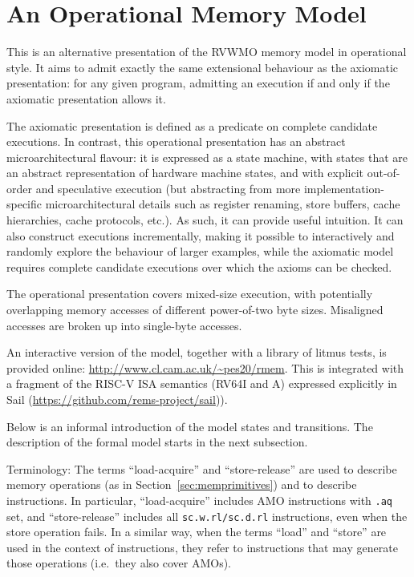 \section{An Operational Memory Model}
\label{sec:operational}
This is an alternative presentation of the RVWMO memory model in
operational style.
%
It aims to admit exactly the same extensional behaviour as the
axiomatic presentation: for any given program, admitting an execution
if and only if the axiomatic presentation allows it.

The axiomatic presentation is defined as a predicate on complete
candidate executions.  In contrast, this operational presentation has
an abstract microarchitectural flavour: it is expressed as a state
machine, with states that are an abstract representation of hardware
machine states, and with explicit out-of-order and speculative
execution
(but abstracting from more implementation-specific microarchitectural
details such as register renaming, store buffers, cache hierarchies, cache protocols, etc.).
As such, it can provide useful intuition.
It can also
construct executions incrementally, making it possible to
interactively and randomly explore the behaviour of larger examples,
while the axiomatic model requires complete candidate executions
over which the axioms can be checked.

The operational presentation covers mixed-size execution, with
potentially overlapping memory accesses of different power-of-two byte
sizes.  Misaligned accesses are broken up into single-byte accesses.

An interactive version of the model, together with a library of litmus tests,
is provided online: \url{http://www.cl.cam.ac.uk/~pes20/rmem}.
This is integrated with a fragment of the RISC-V ISA semantics
(RV64I and A) expressed explicitly in Sail
(\url{https://github.com/rems-project/sail})).


Below is an informal introduction of the model states and transitions.
The description of the formal model starts in the next subsection.


Terminology: The terms ``load-acquire'' and ``store-release'' are used
to describe  memory operations (as in
Section~\ref{sec:memprimitives}) and to describe instructions.
In particular, ``load-acquire'' includes AMO instructions with {\tt .aq} set, and ``store-release'' includes all {\tt sc.w.rl/sc.d.rl} instructions, even when the store operation fails.
In a similar way, when the terms ``load'' and ``store'' are used in the context of instructions, they refer to instructions that may generate those operations (i.e.~they also cover AMOs).



